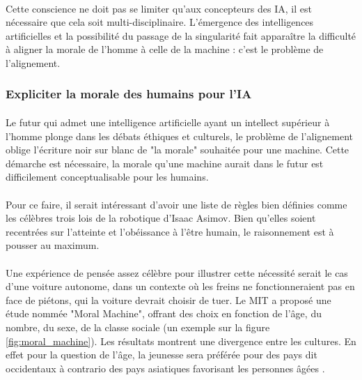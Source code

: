 \documentclass[10pt, french, a4paper]{article}
\begin{document}
\paragraph{}
Cette conscience ne doit pas se limiter qu’aux concepteurs des IA, il est nécessaire que cela soit multi-disciplinaire. L’émergence des intelligences artificielles et la possibilité du passage de la singularité fait apparaître la difficulté à aligner la morale de l’homme à celle de la machine : c’est le problème de l’alignement.

\subsubsection{Expliciter la morale des humains pour l’IA}

\paragraph{}
Le futur qui admet une intelligence artificielle ayant un intellect supérieur à l’homme plonge dans les débats éthiques et culturels, le problème de l’alignement oblige l'écriture noir sur blanc de "la morale" souhaitée pour une machine. Cette démarche est nécessaire, la morale qu’une machine aurait dans le futur est difficilement conceptualisable pour les humains.

\paragraph{}
Pour ce faire, il serait intéressant d’avoir une liste de règles bien définies comme les célèbres trois lois de la robotique d’Isaac Asimov. Bien qu'elles soient recentrées sur l’atteinte et l’obéissance à l’être humain, le raisonnement est à pousser au maximum.

\paragraph{}
Une expérience de pensée assez célèbre pour illustrer cette nécessité serait le cas d'une voiture autonome, dans un contexte où les freins ne fonctionneraient pas en face de piétons, qui la voiture devrait choisir de tuer. Le MIT a proposé une étude nommée "Moral Machine", offrant des choix en fonction de l’âge, du nombre, du sexe, de la classe sociale (un exemple sur la figure \ref{fig:moral_machine}). Les résultats montrent une divergence entre les cultures. En effet pour la question de l’âge, la jeunesse sera préférée pour des pays dit occidentaux à contrario des pays asiatiques favorisant les personnes âgées \citep{awad_moral_2018}.
\end{document}

